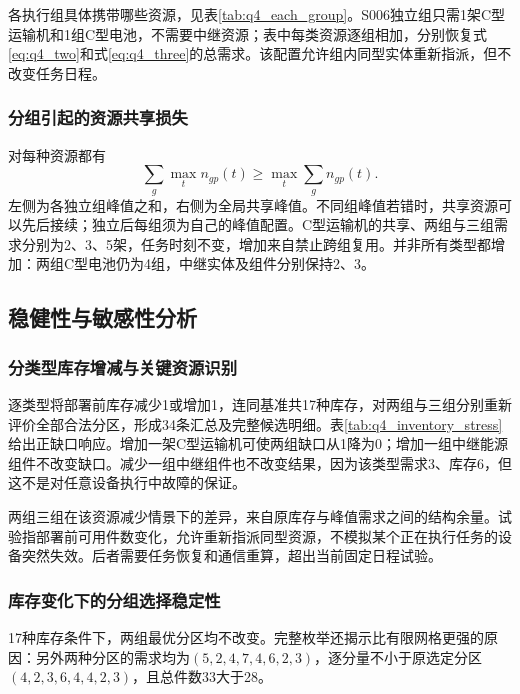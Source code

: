各执行组具体携带哪些资源，见表\ref{tab:q4_each_group}。S006独立组只需1架C型运输机和1组C型电池，不需要中继资源；表中每类资源逐组相加，分别恢复式\eqref{eq:q4_two}和式\eqref{eq:q4_three}的总需求。该配置允许组内同型实体重新指派，但不改变任务日程。


\subsubsection{分组引起的资源共享损失}
对每种资源都有
\begin{equation}
 \sum_g\max_t n_{gp}(t)\ge\max_t\sum_gn_{gp}(t).
\label{eq:q4_pooling}
\end{equation}
左侧为各独立组峰值之和，右侧为全局共享峰值。不同组峰值若错时，共享资源可以先后接续；独立后每组须为自己的峰值配置。C型运输机的共享、两组与三组需求分别为2、3、5架，任务时刻不变，增加来自禁止跨组复用。并非所有类型都增加：两组C型电池仍为4组，中继实体及组件分别保持2、3。



\subsection{稳健性与敏感性分析}
\label{sec:q4_robust}
\subsubsection{分类型库存增减与关键资源识别}
逐类型将部署前库存减少1或增加1，连同基准共17种库存，对两组与三组分别重新评价全部合法分区，形成34条汇总及完整候选明细。表\ref{tab:q4_inventory_stress}给出正缺口响应。增加一架C型运输机可使两组缺口从1降为0；增加一组中继能源组件不改变缺口。减少一组中继组件也不改变结果，因为该类型需求3、库存6，但这不是对任意设备执行中故障的保证。


两组三组在该资源减少情景下的差异，来自原库存与峰值需求之间的结构余量。试验指部署前可用件数变化，允许重新指派同型资源，不模拟某个正在执行任务的设备突然失效。后者需要任务恢复和通信重算，超出当前固定日程试验。

\subsubsection{库存变化下的分组选择稳定性}
17种库存条件下，两组最优分区均不改变。完整枚举还揭示比有限网格更强的原因：另外两种分区的需求均为$(5,2,4,7,4,6,2,3)$，逐分量不小于原选定分区$(4,2,3,6,4,4,2,3)$，且总件数33大于28。

